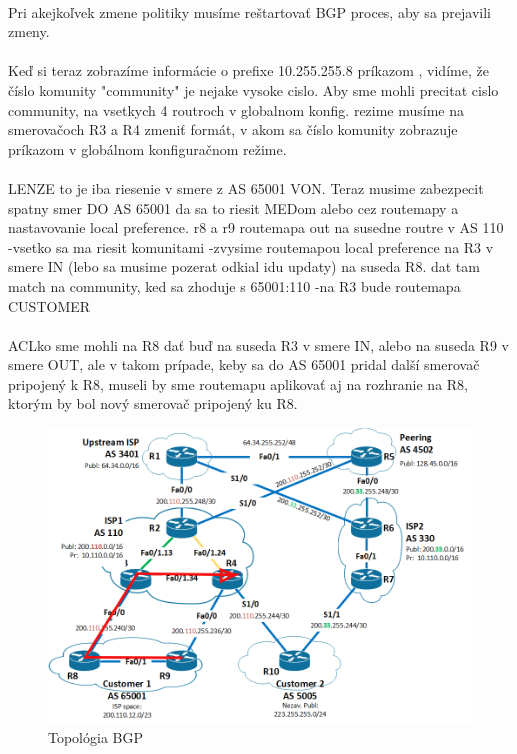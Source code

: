\documentclass[12pt,twoside,a4paper]{report}
\begin{document}
\paragraph{}
Pri akejkoľvek zmene politiky musíme reštartovať BGP proces, aby sa prejavili zmeny.

\paragraph{}
Keď si teraz zobrazíme informácie o prefixe 10.255.255.8 príkazom , vidíme, že číslo komunity "community" je nejake vysoke cislo. Aby sme mohli precitat cislo community, na vsetkych 4 routroch v globalnom konfig. rezime musíme na smerovačoch R3 a R4 zmeniť formát, v akom sa číslo komunity zobrazuje príkazom  v globálnom konfiguračnom režime.

\paragraph{}
LENZE to je iba riesenie v smere z AS 65001 VON. Teraz musime zabezpecit spatny smer DO AS 65001
da sa to riesit MEDom alebo cez routemapy a nastavovanie local preference.
r8 a r9 routemapa out na susedne routre v AS 110
-vsetko sa ma riesit komunitami
-zvysime routemapou local preference na R3 v smere IN (lebo sa musime pozerat odkial idu updaty) na suseda R8. dat tam match na community, ked sa zhoduje s 65001:110
-na R3 bude routemapa CUSTOMER

\paragraph{}
ACLko  sme mohli na R8 dať buď na suseda R3 v smere IN, alebo na suseda R9 v smere OUT, ale v takom prípade, keby sa do AS 65001 pridal další smerovač pripojený k R8, museli by sme routemapu aplikovať aj na rozhranie na R8, ktorým by bol nový smerovač pripojený ku R8.

\begin{figure}[!htbp]
\centering
\includegraphics[width=14cm,keepaspectratio]{bgp_isis_r3_r8_primary}
\caption{Topológia BGP}
\label{fig:bgp_isis_topo}
\end{figure}
\end{document}
